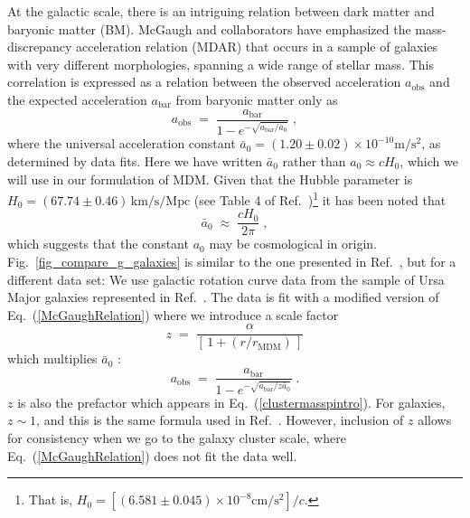 \documentclass{bjp}
\newcommand{\ac}{\bar{a}_0}
\begin{document}
At the galactic scale, there is an intriguing relation between dark matter and baryonic matter (BM). McGaugh and collaborators have emphasized the mass-discrepancy acceleration relation (MDAR) that occurs in a sample of galaxies with very different morphologies, spanning a wide range of stellar mass.\cite{Milgrom:2007br,McGaugh:2016leg,Lelli:2017vgz} 
This correlation is expressed as a relation between the observed acceleration $a_\mathrm{obs}$ and the expected acceleration $a_\mathrm{bar}$ from baryonic matter only as
%
\begin{equation}
a_\mathrm{obs} \;=\; 
\dfrac{a_\mathrm{bar}}{1-e^{-\sqrt{a_\mathrm{bar}/\ac}}}\;,
\label{McGaughRelation}
\end{equation}
%
where the universal acceleration constant $\ac = (1.20\pm 0.02)\times 10^{-10}\mathrm{m/s^2}$, as determined by data fits. Here we have written $\ac$ rather than $a_0\approx cH_0$, which we will use in our formulation of MDM. Given that the Hubble parameter is $H_0 = (67.74\pm 0.46)\,\mathrm{km/s/Mpc}$ (see Table 4 of Ref.~)\footnote{%
That is, $H_0 = \left[(6.581\pm 0.045)\times 10^{-8}\mathrm{cm/s^2}\right]/c$.
} 
it has been noted that
%
\begin{equation}
\ac \;\approx\; \dfrac{cH_0}{2\pi}\;,
\label{coincidence}
\end{equation}
%
which suggests that the constant $a_0$ may be cosmological in origin.\cite{Milgrom:1998sy}
\\

Fig.~\ref{fig_compare_g_galaxies} is similar to the one presented in Ref.~, but for a different data set: We use galactic rotation curve data from the sample of Ursa Major galaxies represented in Ref.~. 
The data is fit with a modified version of Eq.~(\ref{McGaughRelation}) where we introduce a scale factor 
%
\begin{equation}
z \;=\; \dfrac{\alpha}{\left[\,1+ \left(r/r_\mathrm{MDM}\right)\,\right]}
\end{equation}
%
which multiplies $\ac$ :
%
\begin{equation}
a_\mathrm{obs} \;=\; 
\dfrac{a_\mathrm{bar}}{1-e^{-\sqrt{a_\mathrm{bar}/z\ac}}}\;.
\label{modified_McGaughRelation}
\end{equation}
%
$z$ is also the prefactor which appears in Eq.~(\ref{clustermasspintro}). %
For galaxies, $z\sim 1$, and this is the same formula used in Ref.~. However, inclusion of $z$ allows for consistency when we go to the galaxy cluster scale, where Eq.~(\ref{McGaughRelation}) does not fit the data well.
\end{document}
